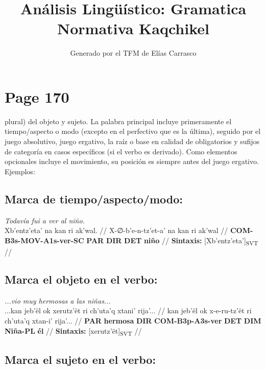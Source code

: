\documentclass{article}%
\title{Análisis Lingüístico: Gramatica Normativa Kaqchikel}%
\author{Generado por el TFM de Elías Carrasco}%
\begin{document}
%
\normalsize%
\maketitle%
\section{Page 170}%
\label{sec:Page170}%
plural) del objeto y sujeto. La palabra principal incluye primeramente el tiempo/aspecto %
o modo (excepto en el perfectivo que es la última), seguido por el juego absolutivo, %
juego ergativo, la raíz o base en calidad de obligatorios y sufijos de categoría en casos %
específicos (si el verbo es derivado). Como elementos opcionales incluye el movimiento, %
su posición es siempre antes del juego ergativo. Ejemplos: %
\subsection{Marca de tiempo/aspecto/modo:}%
\label{subsec:Marcadetiempo/aspecto/modo}%

%
\par\medskip%
\ex
\textit{Todavía fui a ver al niño.} \\
\begingl
\gla Xb'entz'eta' na kan ri ak'wal. //
\glb X-∅-b'e-n-tz'et-a' na kan ri ak'wal //
\glc \textbf{COM-}\textbf{B3s-}\textbf{MOV-}\textbf{A1s-}\textbf{ver-}\textbf{SC} \textbf{PAR} \textbf{DIR} \textbf{DET} \textbf{niño} //
\glft \textbf{Sintaxis:} [Xb'entz'eta']\textsubscript{SVT} //
\endgl
\xe
%
\medskip%
\subsection{Marca el objeto en el verbo:}%
\label{subsec:Marcaelobjetoenelverbo}%

%
\par\medskip%
\ex
\textit{...vio muy hermosas a las niñas...} \\
\begingl
\gla ...kan jeb'ël ok xerutz'ët ri ch'uta'q xtani' rija'... //
\glb kan jeb'ël ok x-e-ru-tz'ët ri ch'uta'q xtan-i' rija'... //
\glc \textbf{PAR} \textbf{hermosa} \textbf{DIR} \textbf{COM-}\textbf{B3p-}\textbf{A3s-}\textbf{ver} \textbf{DET} \textbf{DIM} \textbf{Niña-}\textbf{PL} \textbf{él} //
\glft \textbf{Sintaxis:} [xerutz'ët]\textsubscript{SVT} //
\endgl
\xe
%
\medskip%
\subsection{Marca el sujeto en el verbo:}%
\label{subsec:Marcaelsujetoenelverbo}%
\end{document}
